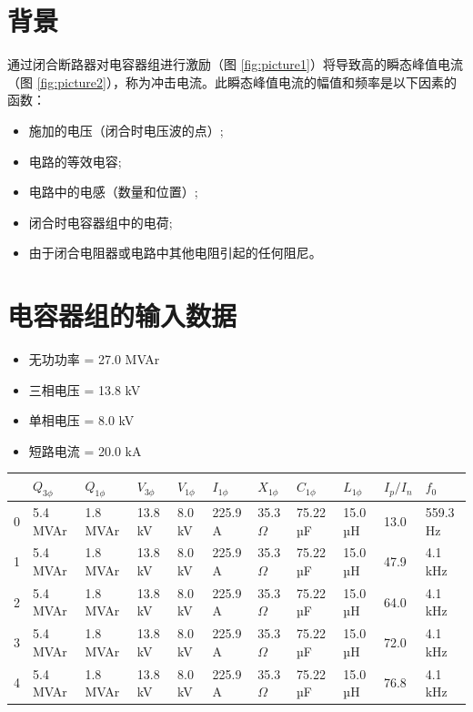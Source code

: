 \documentclass[a4paper]{article}
\begin{document}
	
	\section{背景}
	通过闭合断路器对电容器组进行激励（图 \ref{fig:picture1}）将导致高的瞬态峰值电流（图 \ref{fig:picture2}），称为冲击电流。此瞬态峰值电流的幅值和频率是以下因素的函数：
	\begin{itemize}[label=\textendash]
		\item 施加的电压（闭合时电压波的点）;
		\item 电路的等效电容;
		\item 电路中的电感（数量和位置）;
		\item 闭合时电容器组中的电荷;
		\item 由于闭合电阻器或电路中其他电阻引起的任何阻尼。
	\end{itemize}
	
	\section{电容器组的输入数据}
	\begin{itemize}[label=\textendash]
		\item 无功功率  = {{27.0 MVAr}}
		\item 三相电压  = {{13.8 kV}}
		\item 单相电压  = {{8.0 kV}}
		\item 短路电流  = {{20.0 kA}}
	\end{itemize}
	
	\begin{center}
		\begin{tabular}{lllllllllll}
\toprule
 & $Q_{3\phi}$ & $Q_{1\phi}$ & $V_{3\phi}$ & $V_{1\phi}$ & $I_{1\phi}$ & $X_{1\phi}$ & $C_{1\phi}$ & $L_{1\phi}$ & $I_{p}/I_{n}$ & $f_{0}$ \\
\midrule
0 & 5.4 MVAr & 1.8 MVAr & 13.8 kV & 8.0 kV & 225.9 A & 35.3 $\Omega$ & 75.22 µF & 15.0 µH & 13.0 & 559.3 Hz \\
1 & 5.4 MVAr & 1.8 MVAr & 13.8 kV & 8.0 kV & 225.9 A & 35.3 $\Omega$ & 75.22 µF & 15.0 µH & 47.9 & 4.1 kHz \\
2 & 5.4 MVAr & 1.8 MVAr & 13.8 kV & 8.0 kV & 225.9 A & 35.3 $\Omega$ & 75.22 µF & 15.0 µH & 64.0 & 4.1 kHz \\
3 & 5.4 MVAr & 1.8 MVAr & 13.8 kV & 8.0 kV & 225.9 A & 35.3 $\Omega$ & 75.22 µF & 15.0 µH & 72.0 & 4.1 kHz \\
4 & 5.4 MVAr & 1.8 MVAr & 13.8 kV & 8.0 kV & 225.9 A & 35.3 $\Omega$ & 75.22 µF & 15.0 µH & 76.8 & 4.1 kHz \\
\bottomrule
\end{tabular}

	\end{center}
	
\end{document}
